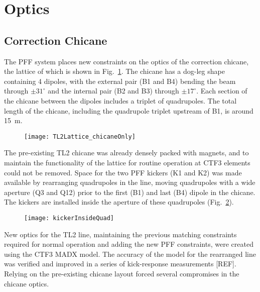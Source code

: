 \section{\label{s:optics}Optics}

\subsection{\label{ss:chicane}Correction Chicane}

The PFF system places new constraints on the optics of the correction chicane, 
the lattice of which is shown in Fig.~\ref{f:TL2Lattice}. The chicane has a 
dog-leg shape containing 
4 dipoles, with the external pair (B1 and B4) bending the beam through 
\(\pm31^\circ\) and 
the internal pair (B2 and B3) through \(\pm17^\circ\). Each section of the 
chicane between 
the dipoles includes a triplet of quadrupoles. The total length of the chicane, 
including the quadrupole triplet upstream of B1, is around 15~m.

\begin{figure}
 \centering
  \texttt{[image: TL2Lattice\_chicaneOnly]}%
  \caption{\label{f:TL2Lattice}
  }
\end{figure}

The pre-existing TL2 chicane was already densely packed with magnets, and to 
maintain the functionality of the lattice for routine operation at CTF3 
elements could not be removed.
Space for the two PFF kickers (K1 and K2) was made available by rearranging 
quadrupoles in the line, moving quadrupoles with a wide aperture (Q3 and Q12) 
prior to the first (B1) and last (B4) dipole in the chicane.
The kickers are installed inside the aperture of these quadrupoles 
(Fig.~\ref{f:kickerInsideQuad}). 

\begin{figure}
  \texttt{[image: kickerInsideQuad]}%
  \caption{\label{f:kickerInsideQuad}
  }
\end{figure}

New optics for the TL2 line, maintaining the previous matching constraints 
required for normal operation and adding the new PFF constraints, were created 
using the CTF3 MADX model. The accuracy of the model for the rearranged line 
was verified and improved in a series of kick-response measurements [REF]. 
Relying on the pre-existing chicane layout forced several compromises in the 
chicane optics.

